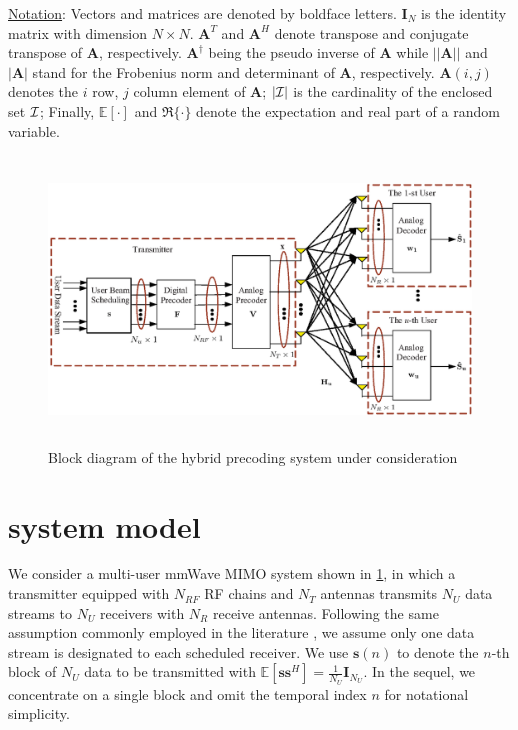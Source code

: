 \documentclass[conference]{IEEEtran}
\begin{document}
\underline{Notation}: Vectors and matrices are denoted by boldface letters. $\bm{I}_N$ is the identity matrix with dimension $N\times N$. ${\bm A}^T$ and ${\bm A}^H$ denote transpose and conjugate transpose of ${\bm A}$, respectively. $\bm{A}^\dagger$ being the pseudo inverse of $\bm{A}$ while $||\bm{A}|| $ and $|\bm{A}|$ stand for the Frobenius norm and determinant of ${\bm A}$, respectively. $\bm{A}(i,j)$ denotes the $i$ row, $j$ column element of ${\bm A}$; $|\cal{I}|$ is the cardinality of the enclosed set ${\cal I}$; Finally, $\mathbb{E}[\cdot] $ and $\Re\{\cdot\}$ denote the expectation and real part of a random variable.

\begin{figure}[htpb]
	\centering
	\begin{minipage}[t]{0.7\linewidth}
		\includegraphics[width=5.6in,height=3in]{PPTFigure/BlockDiagonal.eps}
		\caption{Block diagram of the hybrid precoding system under consideration}\label{fig:BlockDiagram}
		\parbox{6.5cm}{\small \hspace{1.5cm} }
	\end{minipage}
\end{figure}

\section{system model}
We consider a multi-user mmWave MIMO system shown in \figurename{ \ref{fig:BlockDiagram}}, in which a transmitter equipped with $N_{RF}$ RF chains and $N_T$ antennas transmits $N_U$ data streams to $N_U$ receivers with $N_R$ receive antennas. Following the same assumption commonly employed in the literature \cite{alkhateeb2015limited}, we assume only one data stream is designated to each scheduled receiver. We use ${\bm s}(n)$ to denote the $n$-th block of $N_U$ data to be transmitted with $\mathbb{E}\left[\bm{ss}^H\right]=\frac{1}{N_U}\bm{I}_{N_U}$. In the sequel, we concentrate on a single block and omit the temporal index $n$ for notational simplicity.
\end{document}
